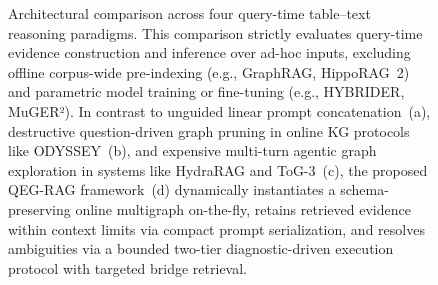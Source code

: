 \begin{figure}[t]
\centering

\vspace{2.5mm}
\caption{Architectural comparison across four query-time table--text reasoning paradigms. This comparison strictly evaluates query-time evidence construction and inference over ad-hoc inputs, excluding offline corpus-wide pre-indexing (e.g., GraphRAG, HippoRAG~2) and parametric model training or fine-tuning (e.g., HYBRIDER, MuGER²). In contrast to unguided linear prompt concatenation~(a), destructive question-driven graph pruning in online KG protocols like ODYSSEY~(b), and expensive multi-turn agentic graph exploration in systems like HydraRAG and ToG-3~(c), the proposed QEG-RAG framework~(d) dynamically instantiates a schema-preserving online multigraph on-the-fly, retains retrieved evidence within context limits via compact prompt serialization, and resolves ambiguities via a bounded two-tier diagnostic-driven execution protocol with targeted bridge retrieval.}
\vspace{-2mm}
\label{fig:paradigms}
\end{figure}
